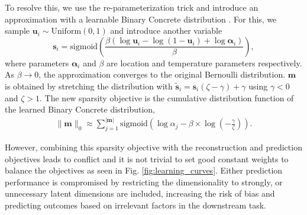 \documentclass[doubleblind]{ecai}
\begin{document}
	
	
	To resolve this, we use the re-parameterization trick and introduce an approximation with a learnable Binary Concrete distribution \citep{maddison2017the}. For this, we sample $\mathbf{u}_i \sim \text{Uniform}(0, 1)$ and introduce another variable
	\begin{equation}
		\mathbf{s}_i 
		= 
		\text{sigmoid}\left(\frac{\beta (\log \mathbf{u}_i - \log (1 - \mathbf{u}_i) + \log \boldsymbol{\alpha}_i)}{\beta}\right),
	\end{equation}
	where parameters $\boldsymbol{\alpha}_i$ and $\beta$ are location and temperature parameters respectively. As $\beta \to 0$, the approximation converges to the original Bernoulli distribution. $\mathbf{m}$ is obtained by stretching the distribution with $\tilde { \mathbf{s}}_i = \mathbf{s}_i (\zeta - \gamma) + \gamma$ using $\gamma < 0$ and $\zeta > 1$. The new sparsity objective is the cumulative distribution function of the learned Binary Concrete distribution, 
	\begin{equation}
		\begin{aligned}
			\| \mathbf {m}\|_0 
			\approx
			\sum_{j=1}^{| \boldsymbol {m}|} \text{sigmoid} \left(\log \alpha_j - \beta \times \log \left(-\frac{\gamma}{\zeta}\right)\right)
			.
		\end{aligned}
	\end{equation}
	
	
	However, combining this sparsity objective with the reconstruction and prediction objectives leads to conflict and it is not trivial to set good constant weights to balance the objectives as seen in Fig. \ref{fig:learning_curves}. Either prediction performance is compromised by restricting the dimensionality to strongly, or unnecessary latent dimensions are included, increasing the risk of bias and predicting outcomes based on irrelevant factors in the downstream task.
	
\end{document}
